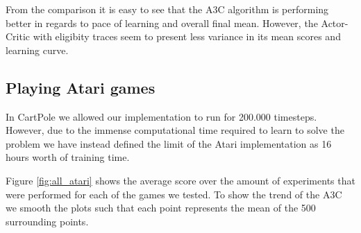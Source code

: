 \documentclass[11pt]{article}
\begin{document}
From the comparison it is easy to see that the A3C algorithm is performing
better in regards to pace of learning and overall final mean.
However, the Actor-Critic with eligibity traces seem to present less variance
in its mean scores and learning curve.

\subsection{Playing Atari games}

In CartPole we allowed our implementation to run for 200.000 timesteps.
However, due to the immense computational time required to
learn to solve the problem we have instead defined the limit of the
Atari implementation as 16 hours worth of training time.

Figure \ref{fig:all_atari} shows the average score over the amount of
experiments that were performed for each of the games we tested.
To show the trend of the A3C we smooth the plots such that
each point represents the mean of the 500 surrounding points.
\end{document}
